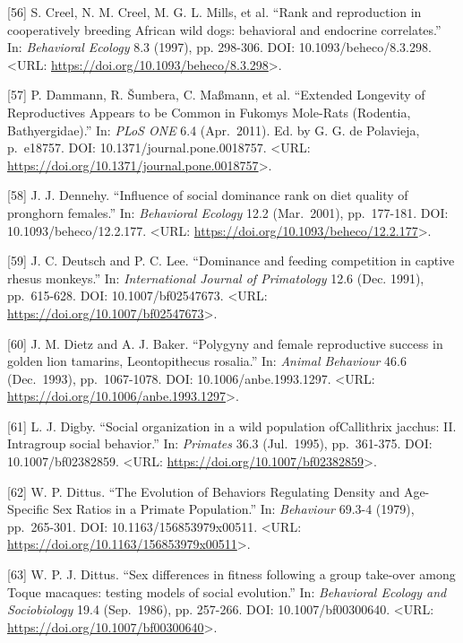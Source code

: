 \documentclass[
]{article}
\begin{document}
{[}56{]} S. Creel, N. M. Creel, M. G. L. Mills, et al. ``Rank and
reproduction in cooperatively breeding African wild dogs: behavioral and
endocrine correlates.'' In: \emph{Behavioral Ecology} 8.3 (1997), pp.
298-306. DOI: 10.1093/beheco/8.3.298. \textless URL:
\url{https://doi.org/10.1093/beheco/8.3.298}\textgreater.

{[}57{]} P. Dammann, R. Šumbera, C. Maßmann, et al. ``Extended Longevity
of Reproductives Appears to be Common in Fukomys Mole-Rats (Rodentia,
Bathyergidae).'' In: \emph{PLoS ONE} 6.4 (Apr.~2011). Ed. by G. G. de
Polavieja, p.~e18757. DOI: 10.1371/journal.pone.0018757. \textless URL:
\url{https://doi.org/10.1371/journal.pone.0018757}\textgreater.

{[}58{]} J. J. Dennehy. ``Influence of social dominance rank on diet
quality of pronghorn females.'' In: \emph{Behavioral Ecology} 12.2
(Mar.~2001), pp.~177-181. DOI: 10.1093/beheco/12.2.177. \textless URL:
\url{https://doi.org/10.1093/beheco/12.2.177}\textgreater.

{[}59{]} J. C. Deutsch and P. C. Lee. ``Dominance and feeding
competition in captive rhesus monkeys.'' In: \emph{International Journal
of Primatology} 12.6 (Dec. 1991), pp.~615-628. DOI: 10.1007/bf02547673.
\textless URL: \url{https://doi.org/10.1007/bf02547673}\textgreater.

{[}60{]} J. M. Dietz and A. J. Baker. ``Polygyny and female reproductive
success in golden lion tamarins, Leontopithecus rosalia.'' In:
\emph{Animal Behaviour} 46.6 (Dec.~1993), pp.~1067-1078. DOI:
10.1006/anbe.1993.1297. \textless URL:
\url{https://doi.org/10.1006/anbe.1993.1297}\textgreater.

{[}61{]} L. J. Digby. ``Social organization in a wild population
ofCallithrix jacchus: II. Intragroup social behavior.'' In:
\emph{Primates} 36.3 (Jul.~1995), pp.~361-375. DOI: 10.1007/bf02382859.
\textless URL: \url{https://doi.org/10.1007/bf02382859}\textgreater.

{[}62{]} W. P. Dittus. ``The Evolution of Behaviors Regulating Density
and Age-Specific Sex Ratios in a Primate Population.'' In:
\emph{Behaviour} 69.3-4 (1979), pp.~265-301. DOI:
10.1163/156853979x00511. \textless URL:
\url{https://doi.org/10.1163/156853979x00511}\textgreater.

{[}63{]} W. P. J. Dittus. ``Sex differences in fitness following a group
take-over among Toque macaques: testing models of social evolution.''
In: \emph{Behavioral Ecology and Sociobiology} 19.4 (Sep.~1986), pp.
257-266. DOI: 10.1007/bf00300640. \textless URL:
\url{https://doi.org/10.1007/bf00300640}\textgreater.
\end{document}

